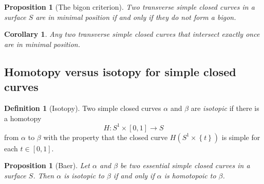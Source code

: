 \documentclass[reqno]{amsart}
\newtheorem{proposition}[theorem]{Proposition}
\newtheorem{corollary}[theorem]{Corollary}
\theoremstyle{definition}
\newtheorem{definition}[theorem]{Definition}
\theoremstyle{remark}
\begin{document}
\begin{proposition}[The bigon criterion]
    Two transverse simple closed curves in a surface $S$ are in
    minimal position if and only if they do not form
    a bigon.
\end{proposition}

\begin{corollary}
    Any two transverse simple closed curves that intersect exactly once are in
    minimal position.
\end{corollary}

\subsection*{Homotopy versus isotopy for simple closed curves}

\begin{definition}[Isotopy]
    Two simple closed curves $\alpha$ and $\beta$ are \textit{isotopic}
    if there is a homotopy 
    \[
    H \colon S^{1} \times \left[ 0,1 \right] \to 
    S
    \] 
    from $\alpha$ to $\beta$ with the property that the closed
    curve $H \left( S^{1} \times \left\{ t \right\}  \right) $ 
    is simple for each $t \in \left[ 0,1 \right] $.
\end{definition}

\begin{proposition}[Baer]
    Let $\alpha$ and $\beta$ be two essential simple closed curves
    in a surface $S$. Then $\alpha$ is isotopic to $\beta$ if and
    only if $\alpha$ is homotopoic to $\beta$.
\end{proposition}
\end{document}
